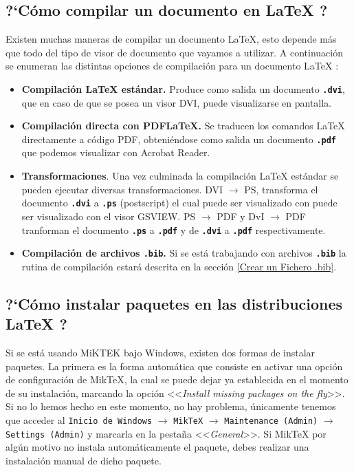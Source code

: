 \subsection{?`C\'{o}mo compilar un documento en \LaTeX{} ?}

Existen muchas maneras de compilar un documento \LaTeX{}, esto depende más que todo del tipo de visor de documento que vayamos a utilizar. A continuación se enumeran las distintas opciones de compilación para un documento \LaTeX{} :
\begin{itemize}
\item \textbf{ Compilación \LaTeX{} estándar.} Produce como salida un documento \texttt{\textbf{.dvi}}, que en caso de que se posea un visor DVI, puede visualizarse en pantalla.
\item \textbf{ Compilación directa con PDF\LaTeX{}.} Se traducen los comandos \LaTeX{} directamente a código PDF, obteniéndose como salida un documento \texttt{\textbf{.pdf}} que
podemos visualizar con Acrobat Reader.
\item \textbf{Transformaciones}. Una vez culminada la compilación \LaTeX{} estándar se pueden ejecutar diversas transformaciones. DVI $\rightarrow$ PS, transforma el documento \texttt{\textbf{.dvi}} a \texttt{\textbf{.ps}} (postscript) el cual puede ser visualizado con puede ser visualizado con el visor GSVIEW. PS $\rightarrow$ PDF y DvI $\rightarrow$ PDF tranforman el documento \texttt{\textbf{.ps}} a \texttt{\textbf{.pdf}} y de \texttt{\textbf{.dvi}} a \texttt{\textbf{.pdf}} respectivamente.
\item \textbf{Compilaci\'{o}n de archivos \texttt{\textbf{.bib}}.} Si se est\'{a} trabajando con archivos \texttt{\textbf{.bib}} la rutina de compilaci\'{o}n estar\'{a} descrita en la secci\'{o}n \ref{Crear un Fichero .bib}.
\end{itemize}

		
\subsection{?`Cómo instalar paquetes en las distribuciones \LaTeX{} ?}
\label{instalar paquetes}
Si se está usando MiKTEK bajo Windows, existen dos formas de instalar paquetes. La primera es la forma automática que consiste en activar una opción de configuración de MikTeX, la cual se puede dejar ya establecida en el momento de su instalación, marcando la opción <<\textit{Install missing packages on the fly}>>. Si no lo hemos hecho en este momento, no hay problema, únicamente tenemos que acceder al \texttt{Inicio de Windows} $\rightarrow$ \texttt{MikTeX} $\rightarrow$ \texttt{Maintenance (Admin)} $\rightarrow$ \texttt{Settings (Admin)} y marcarla en la pestaña <<\textit{General}>>. Si MikTeX por algún motivo no instala automáticamente el paquete, debes realizar una instalación manual de dicho paquete. 

